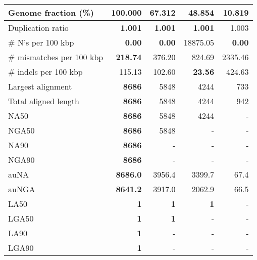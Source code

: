 \documentclass[12pt,a4paper]{article}
\begin{document}
\begin{table}[ht]
\begin{center}
\begin{tabular}{|l*{4}{|r}|}
Genome fraction (\%) & {\bf 100.000} & 67.312 & 48.854 & 10.819 \\ \hline
Duplication ratio & {\bf 1.001} & {\bf 1.001} & {\bf 1.001} & 1.003 \\ \hline
\# N's per 100 kbp & {\bf 0.00} & {\bf 0.00} & 18875.05 & {\bf 0.00} \\ \hline
\# mismatches per 100 kbp & {\bf 218.74} & 376.20 & 824.69 & 2335.46 \\ \hline
\# indels per 100 kbp & 115.13 & 102.60 & {\bf 23.56} & 424.63 \\ \hline
Largest alignment & {\bf 8686} & 5848 & 4244 & 733 \\ \hline
Total aligned length & {\bf 8686} & 5848 & 4244 & 942 \\ \hline
NA50 & {\bf 8686} & 5848 & 4244 & - \\ \hline
NGA50 & {\bf 8686} & 5848 & - & - \\ \hline
NA90 & {\bf 8686} & - & - & - \\ \hline
NGA90 & {\bf 8686} & - & - & - \\ \hline
auNA & {\bf 8686.0} & 3956.4 & 3399.7 & 67.4 \\ \hline
auNGA & {\bf 8641.2} & 3917.0 & 2062.9 & 66.5 \\ \hline
LA50 & {\bf 1} & {\bf 1} & {\bf 1} & - \\ \hline
LGA50 & {\bf 1} & {\bf 1} & - & - \\ \hline
LA90 & {\bf 1} & - & - & - \\ \hline
LGA90 & {\bf 1} & - & - & - \\ \hline
\end{tabular}
\end{center}
\end{table}
\end{document}
